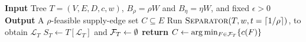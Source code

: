 \begin{algorithm}[h]
    \DontPrintSemicolon
    \caption{Full-quota separator partitioning}\label{alg:centroid-full-quota}
    \textbf{Input} Tree $T=(V,E,D,c,w)$, $B_\rho=\rho W$ and $B_\eta=\eta W$, and fixed $\epsilon>0$\;
    \textbf{Output} A $\rho$-feasible supply-edge set $C\subseteq E$\;
    Run $\textsc{Separator}(T, w, t=\lceil1/\rho\rceil)$, to obtain $\mathcal{L}_T$ \;
    $S_T\gets T[\mathcal{L}_T]$ and $\mathcal{F}_T\gets\emptyset$\;
    \textbf{return} $C\gets\arg\min_{F\in\mathcal{F}_T}\mathopen{}\left\{ c(F) \right\}$\;
\end{algorithm}